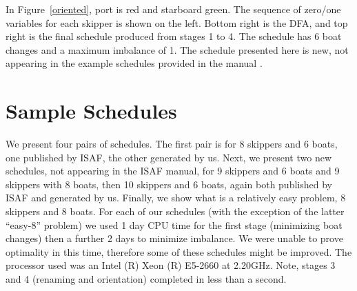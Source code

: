 \documentclass{llncs}
\begin{document}
In Figure~\ref{oriented}, port is red and starboard green. The sequence of zero/one variables for
each skipper is shown on the left. Bottom right is the DFA, and top right is the final schedule
produced from stages 1 to 4. The schedule has 6 boat changes and a maximum imbalance of 1. 
The schedule presented here is new, not appearing in the example schedules provided in the manual
\cite{isaf}.

\section{Sample Schedules}\label{sec:samples}
We present four pairs of schedules. The first pair is for 8 skippers and 6 boats, one published by
ISAF, the other generated by us. Next, we present two new schedules, not appearing in the ISAF
manual, for 9 skippers and 6 boats and 9 skippers with 8 boats, then 10 skippers and 6 boats, again
both published by ISAF and generated by us. Finally, we show what is a relatively easy problem, 8 skippers
and 8 boats.  For each of our schedules (with the exception of the latter ``easy-8'' problem) we used 1 day
CPU time for the first stage (minimizing boat changes) then a further 2 days to minimize imbalance. We were unable to prove optimality in this time, therefore some of
these schedules might be improved. The processor used was an Intel (R) Xeon (R) E5-2660 at 2.20GHz. 
Note, stages 3 and 4 (renaming and orientation) completed in less than a second.
\end{document}
